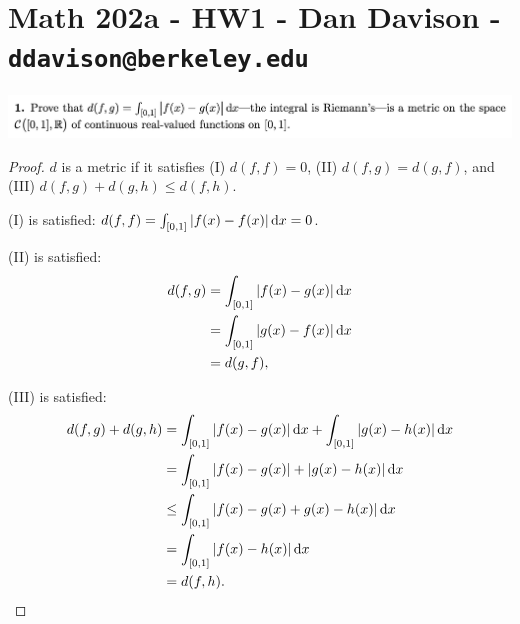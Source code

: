 \section*{Math 202a - HW1 - Dan Davison - \texttt{ddavison@berkeley.edu}}


\begin{mdframed}
  \includegraphics[width=400pt]{img/analysis--berkeley-202a--homework-1-a75a.png}
\end{mdframed}


\begin{proof}
  $d$ is a metric if it satisfies (I) $d(f,f) = 0$, (II) $d(f,g) = d(g, f)$, and (III) $d(f,g) + d(g, h) \le d(f, h)$.

  (I) is satisfied: $d(f, f) = \int_{[0,1]}|f(x) - f(x)| \dx = 0$.

  (II) is satisfied:
  \begin{align*}
    d(f, g)
    &= \int_{[0,1]}|f(x) - g(x)| \dx \\
    &= \int_{[0,1]}|g(x) - f(x)| \dx \\
    &= d(g, f),
  \end{align*}

  (III) is satisfied:
  \begin{align*}
    d(f, g) + d(g, h)
    &= \int_{[0,1]} |f(x) - g(x)| \dx + \int_{[0,1]} |g(x) - h(x)| \dx \\
    &= \int_{[0,1]} |f(x) - g(x)| + |g(x) - h(x)| \dx \\
    &\le \int_{[0,1]} |f(x) - g(x) + g(x) - h(x)| \dx \\
    &= \int_{[0,1]} |f(x) - h(x)| \dx \\
    &= d(f, h).
  \end{align*}
\end{proof}

